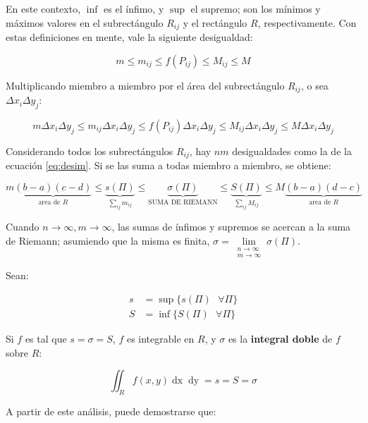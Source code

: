 \documentclass{article}
\begin{document}
En este contexto, $\inf$ es el ínfimo, y $\sup$ el supremo; son los mínimos y máximos valores en el subrectángulo $R_{ij}$ y el rectángulo $R$, respectivamente. Con estas definiciones en mente, vale la siguiente desigualdad:

\begin{equation}
m \leq m_{ij} \leq f(P_{ij}) \leq M_{ij} \leq M
\end{equation}

Multiplicando miembro a miembro por el área del subrectángulo $R_{ij}$, o sea $\Delta x_i \Delta y_j$:

\begin{equation}
m \Delta x_i \Delta y_j \leq m_{ij} \Delta x_i \Delta y_j \leq f(P_{ij}) \Delta x_i \Delta y_j \leq M_{ij} \Delta x_i \Delta y_j \leq M \Delta x_i \Delta y_j
\label{eq:desim}
\end{equation}

Considerando todos los subrectángulos $R_{ij}$, hay $n m$ desigualdades como la de la ecuación \ref{eq:desim}. Si se las suma a todas miembro a miembro, se obtiene:

\begin{equation}
m \underbrace{(b-a) (c-d)}_{\text{area de } R} \leq \underbrace{ s(\Pi) }_{\sum_{ij} m_{ij}} \leq \underbrace{ \sigma(\Pi) }_{\text{SUMA DE RIEMANN}} \leq \underbrace{ S(\Pi) }_{\sum_{ij} M_{ij}} \leq M \underbrace{(b-a) (d-c)}_{\text{area de } R}
\end{equation}

Cuando $n \rightarrow \infty, m \rightarrow \infty$, las sumas de ínfimos y supremos se acercan a la suma de Riemann; asumiendo que la misma es finita, $\sigma = \lim\limits_{\substack{n \rightarrow \infty \\ m \rightarrow \infty}} \sigma(\Pi)$. 

Sean:

\begin{align}
s &= \sup\{ s(\Pi) \text{ } \forall \Pi \} \\
S &= \inf\{ S(\Pi) \text{ } \forall \Pi \}
\end{align}

Si $f$ es tal que $s = \sigma = S$, $f$ es integrable en $R$, y $\sigma$ es la \textbf{integral doble} de $f$ sobre $R$:

\begin{equation}
\iint_R f(x,y) \mathop{dx} \mathop{dy} = s = S = \sigma
\end{equation}

A partir de este análisis, puede demostrarse que:
\end{document}
